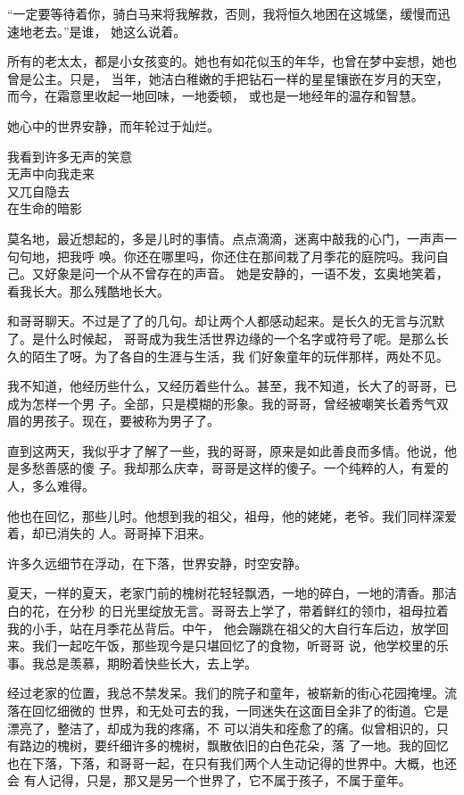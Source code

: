		“一定要等待着你，骑白马来将我解救，否则，我将恒久地困在这城堡，缓慢而迅速地老去。”是谁，
	她这么说着。

		所有的老太太，都是小女孩变的。她也有如花似玉的年华，也曾在梦中妄想，她也曾是公主。只是，
	当年，她洁白稚嫩的手把钻石一样的星星镶嵌在岁月的天空，而今，在霜意里收起一地回味，一地委顿，
	或也是一地经年的温存和智慧。

		她心中的世界安静，而年轮过于灿烂。

	\endwriting



		\longpoem{}{}{}
			我看到许多无声的笑意 \\
			无声中向我走来 \\
			又兀自隐去 \\
			在生命的暗影
		\endlongpoem

		莫名地，最近想起的，多是儿时的事情。点点滴滴，迷离中敲我的心门，一声声一句句地，把我呼
	唤。你还在哪里吗，你还住在那间栽了月季花的庭院吗。我问自己。又好象是问一个从不曾存在的声音。
	她是安静的，一语不发，玄奥地笑着，看我长大。那么残酷地长大。

		和哥哥聊天。不过是了了的几句。却让两个人都感动起来。是长久的无言与沉默了。是什么时候起，
	哥哥成为我生活世界边缘的一个名字或符号了呢。是那么长久的陌生了呀。为了各自的生涯与生活，我
	们好象童年的玩伴那样，两处不见。

		我不知道，他经历些什么，又经历着些什么。甚至，我不知道，长大了的哥哥，已成为怎样一个男
	子。全部，只是模糊的形象。我的哥哥，曾经被嘲笑长着秀气双眉的男孩子。现在，要被称为男子了。

		直到这两天，我似乎才了解了一些，我的哥哥，原来是如此善良而多情。他说，他是多愁善感的傻
	子。我却那么庆幸，哥哥是这样的傻子。一个纯粹的人，有爱的人，多么难得。

		他也在回忆，那些儿时。他想到我的祖父，祖母，他的姥姥，老爷。我们同样深爱着，却已消失的
	人。哥哥掉下泪来。

		许多久远细节在浮动，在下落，世界安静，时空安静。

		夏天，一样的夏天，老家门前的槐树花轻轻飘洒，一地的碎白，一地的清香。那洁白的花，在分秒
	的日光里绽放无言。哥哥去上学了，带着鲜红的领巾，祖母拉着我的小手，站在月季花丛背后。中午，
	他会蹦跳在祖父的大自行车后边，放学回来。我们一起吃午饭，那些现今是只堪回忆了的食物，听哥哥
	说，他学校里的乐事。我总是羡慕，期盼着快些长大，去上学。

		经过老家的位置，我总不禁发呆。我们的院子和童年，被崭新的街心花园掩埋。流落在回忆细微的
	世界，和无处可去的我，一同迷失在这面目全非了的街道。它是漂亮了，整洁了，却成为我的疼痛，不
	可以消失和痊愈了的痛。似曾相识的，只有路边的槐树，要纤细许多的槐树，飘散依旧的白色花朵，落
	了一地。我的回忆也在下落，下落，和哥哥一起，在只有我们两个人生动记得的世界中。大概，也还会
	有人记得，只是，那又是另一个世界了，它不属于孩子，不属于童年。

